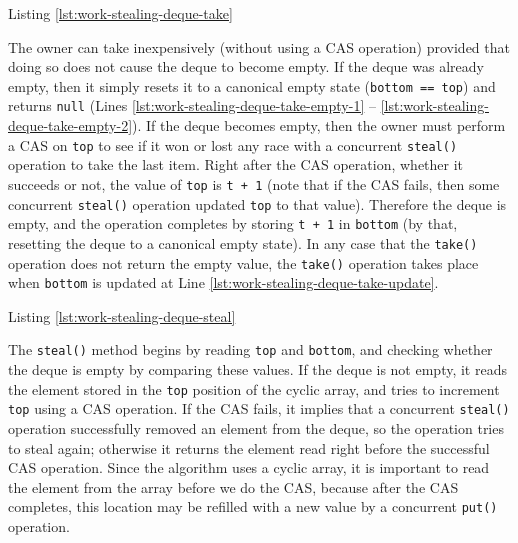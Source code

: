 


Listing \ref{lst:work-stealing-deque-take}

The owner can take inexpensively (without using a CAS operation)
provided that doing so does not cause the deque to become empty. If
the deque was already empty, then it simply resets it to a canonical
empty state (\lstinline!bottom == top!) and returns \lstinline!null!
(Lines \ref{lst:work-stealing-deque-take-empty-1} --
\ref{lst:work-stealing-deque-take-empty-2}). If the deque becomes
empty, then the owner must perform a CAS on \lstinline!top! to see if
it won or lost any race with a concurrent \lstinline!steal()!
operation to take the last item. Right after the CAS operation,
whether it succeeds or not, the value of \lstinline!top! is
\lstinline!t + 1! (note that if the CAS fails, then some concurrent
\lstinline!steal()!  operation updated \lstinline!top! to that
value). Therefore the deque is empty, and the operation completes by
storing \lstinline!t + 1! in \lstinline!bottom!  (by that, resetting
the deque to a canonical empty state). In any case that the
\lstinline!take()!  operation does not return the empty value, the
\lstinline!take()! operation takes place when \lstinline!bottom! is
updated at Line \ref{lst:work-stealing-deque-take-update}.



Listing \ref{lst:work-stealing-deque-steal}

The \lstinline!steal()! method begins by reading \lstinline!top! and
\lstinline!bottom!, and checking whether the deque is empty by
comparing these values. If the deque is not empty, it reads the
element stored in the \lstinline!top! position of the cyclic array,
and tries to increment \lstinline!top! using a CAS operation. If the
CAS fails, it implies that a concurrent \lstinline!steal()! operation
successfully removed an element from the deque, so the operation tries
to steal again; otherwise it returns the element read right before the
successful CAS operation. Since the algorithm uses a cyclic array, it
is important to read the element from the array before we do the CAS,
because after the CAS completes, this location may be refilled with a
new value by a concurrent \lstinline!put()!  operation.

